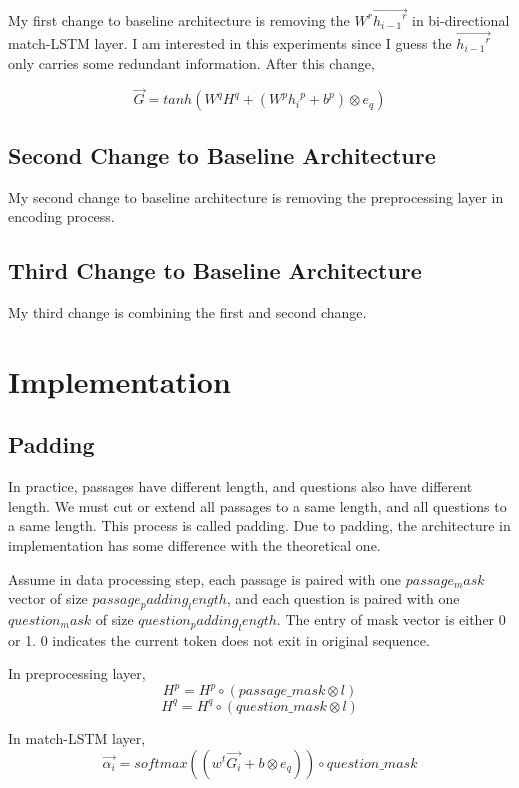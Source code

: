 \documentclass[modernstyle,12pt]{sjsuthesis}
\theoremstyle{definition}
\begin{document}
My first change to baseline architecture is removing the $W^r\overrightarrow{{h_{i-1}}^r}$ in bi-directional match-LSTM layer. I am interested in this experiments since I guess the $\overrightarrow{{h_{i-1}}^r}$ only carries some redundant information. After this change,


$$\overrightarrow{G} = tanh(W^qH^q + (W^p{h_i}^p + b^p) \otimes e_q)$$


\section{Second Change to Baseline Architecture}

My second change to baseline architecture is removing the preprocessing layer in encoding process.

\section{Third Change to Baseline Architecture}

My third change is combining the first and second change.

\chapter{Implementation}

\section{Padding}\label{sect:padding}

In practice, passages have different length, and questions also have different length. We must cut or extend all passages to a same length, and all questions to a same length. This process is called padding. Due to padding, the architecture in implementation has some difference with the theoretical one.

Assume in data processing step, each passage is paired with one $passage_mask$ vector of size $passage_padding_length$, and each question is paired with one $question_mask$ of size $question_padding_length$. The entry of mask vector is either 0 or 1. 0 indicates the current token does not exit in original sequence.

In preprocessing layer,
$$H^p = H^p \circ (passage\_mask \otimes l)$$
$$H^q = H^q \circ (question\_mask \otimes l)$$

In match-LSTM layer,
$$\overrightarrow{\alpha _i} = softmax( (w^t\overrightarrow{G_i} + b \otimes e_q) ) \circ question\_mask $$
\end{document}
